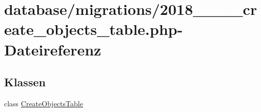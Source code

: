 \hypertarget{2018__06__15__144445__create__objects__table_8php}{}\section{database/migrations/2018\+\_\+\_\+\_\+\_\+create\+\_\+objects\+\_\+table.php-\/\+Dateireferenz}
\label{2018__06__15__144445__create__objects__table_8php}
\subsection*{Klassen}
\begin{DoxyCompactItemize}
\item 
class \hyperlink{classCreateObjectsTable}{Create\+Objects\+Table}
\end{DoxyCompactItemize}
